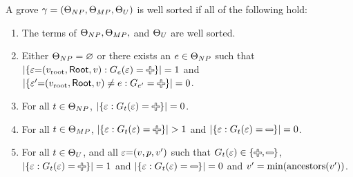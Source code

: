 \begin{definition}
  A grove $\Grove = (\Set[NP], \Set[MP], \Set[U])$ is well sorted if all of the following hold:
  \begin{enumerate}
    \item
      The terms of $\Set[NP], \Set[MP],$ and $\Set[U]$ are well sorted.
    \item
      Either $\Set[NP] = \varnothing$
      or there exists an $e \in \Set[NP]$ such that
      $\SizeOf{\SetOf{\e{=}(\rootVertex, \Root, v) \SuchThat{G_e(\e) = \Plus}}} = 1$ and
      $\SizeOf{\SetOf{\e'{=}(\rootVertex, \Root, v) \neq e \SuchThat{G_{e'} = \Plus}}} = 0$.
    \item
      For all $t \in \Set[NP]$,
        $\SizeOf{\SetOf{\e \SuchThat{G_t(\e) = \Plus}}} = 0$.
    \item
      For all $t \in \Set[MP]$,
        $\SizeOf{\SetOf{\e \SuchThat{G_t(\e) = \Plus}}} > 1$ and
        $\SizeOf{\SetOf{\e \SuchThat{G_t(\e) = \Minus}}} = 0$.
    \item
      For all $t \in \Set[U]$,
      and all $\e{=}(v, p, v')$ such that $G_t(\e) \in \SetOf{\Plus, \Minus}$,
        $\SizeOf{\SetOf{\e \SuchThat{G_t(\e) = \Plus}}} = 1$ and
        $\SizeOf{\SetOf{\e \SuchThat{G_t(\e) = \Minus}}} = 0$ and
        $v' = \min{\ancestors{v'}}$.
  \end{enumerate}
\end{definition}

